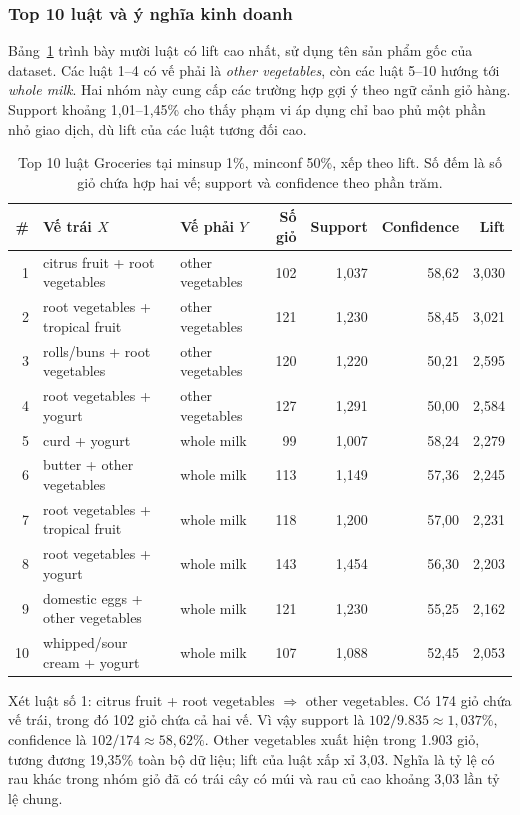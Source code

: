 \subsubsection{Top 10 luật và ý nghĩa kinh doanh}
Bảng~\ref{tab:rules} trình bày mười luật có lift cao nhất, sử dụng tên
sản phẩm gốc của dataset. Các luật 1--4 có vế phải là
\textit{other vegetables}, còn các luật 5--10 hướng tới
\textit{whole milk}. Hai nhóm này cung cấp các trường hợp gợi ý theo
ngữ cảnh giỏ hàng. Support khoảng 1,01--1,45\% cho thấy phạm vi áp dụng
chỉ bao phủ một phần nhỏ giao dịch, dù lift của các luật tương đối cao.

\begin{table}[!t]
\caption{Top 10 luật Groceries tại minsup 1\%, minconf 50\%, xếp theo lift. Số đếm là số giỏ chứa hợp hai vế; support và confidence theo phần trăm.}\label{tab:rules}
\centering\footnotesize
\begin{tabular}{rp{}p{}rrrr}\toprule
\# & Vế trái $X$ & Vế phải $Y$ & Số giỏ & Support & Confidence & Lift \\\midrule
1 & citrus fruit + root vegetables & other vegetables & 102 & 1,037 & 58,62 & 3,030 \\
2 & root vegetables + tropical fruit & other vegetables & 121 & 1,230 & 58,45 & 3,021 \\
3 & rolls/buns + root vegetables & other vegetables & 120 & 1,220 & 50,21 & 2,595 \\
4 & root vegetables + yogurt & other vegetables & 127 & 1,291 & 50,00 & 2,584 \\
5 & curd + yogurt & whole milk & 99 & 1,007 & 58,24 & 2,279 \\
6 & butter + other vegetables & whole milk & 113 & 1,149 & 57,36 & 2,245 \\
7 & root vegetables + tropical fruit & whole milk & 118 & 1,200 & 57,00 & 2,231 \\
8 & root vegetables + yogurt & whole milk & 143 & 1,454 & 56,30 & 2,203 \\
9 & domestic eggs + other vegetables & whole milk & 121 & 1,230 & 55,25 & 2,162 \\
10 & whipped/sour cream + yogurt & whole milk & 107 & 1,088 & 52,45 & 2,053 \\
\bottomrule\end{tabular}
\end{table}

Xét luật số 1: citrus fruit + root vegetables $\Rightarrow$ other vegetables.
Có 174 giỏ chứa vế trái, trong đó 102 giỏ chứa cả hai vế. Vì vậy support
là $102/9.835\approx1,037\%$, confidence là $102/174\approx58,62\%$.
Other vegetables xuất hiện trong 1.903 giỏ, tương đương 19,35\% toàn bộ
dữ liệu; lift của luật xấp xỉ 3,03. Nghĩa là tỷ lệ có rau khác trong nhóm
giỏ đã có trái cây có múi và rau củ cao khoảng 3,03 lần tỷ lệ chung.

